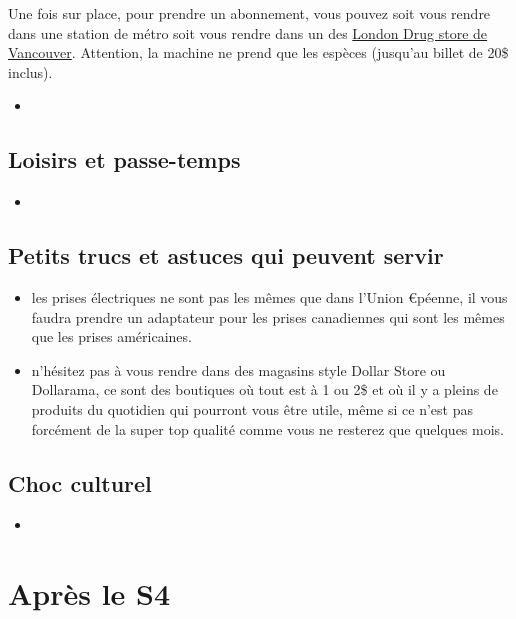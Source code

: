 \documentclass{article}
\begin{document}
Une fois sur place, pour prendre un abonnement, vous pouvez soit vous rendre dans une station de métro soit vous rendre dans un des \href{https://www.translink.ca/-/media/translink/documents/transit-fares/where-to-buy/london_drugs_compass_vending_machine_locations.pdf}{London Drug store de Vancouver}. Attention, la machine ne prend que les espèces (jusqu'au billet de 20\$ inclus).
\begin{itemize}
    \item
\end{itemize}
\subsection{Loisirs et passe-temps}
\begin{itemize}
    \item
\end{itemize}
\subsection{Petits trucs et astuces qui peuvent servir}
\begin{itemize}
    \item les prises électriques ne sont pas les mêmes que dans l'Union €péenne, il vous faudra prendre un adaptateur pour les prises canadiennes qui sont les mêmes que les prises américaines.
    \item n'hésitez pas à vous rendre dans des magasins style Dollar Store ou Dollarama, ce sont des boutiques où tout est à 1 ou 2\$ et où il y a pleins de produits du quotidien qui pourront vous être utile, même si ce n'est pas forcément de la super top qualité comme vous ne resterez que quelques mois.
\end{itemize}
\subsection{Choc culturel}
\begin{itemize}
    \item
\end{itemize}
\section{Après le S4}
\end{document}
